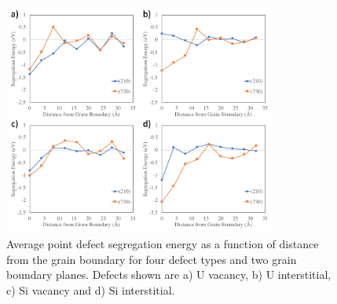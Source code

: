\documentclass[review]{elsarticle}
\begin{document}

\begin{figure}[h]
 \centering
 \includegraphics[width=0.8\textwidth]{gbdefs_seg.png} 
 \caption{Average point defect segregation energy as a function of distance from the grain boundary for four defect types and two grain boundary planes. Defects shown are a) U vacancy, b) U interstitial, c) Si vacancy and d) Si interstitial. }
 \label{fig:seg}
\end{figure}

\FloatBarrier
\end{document}
